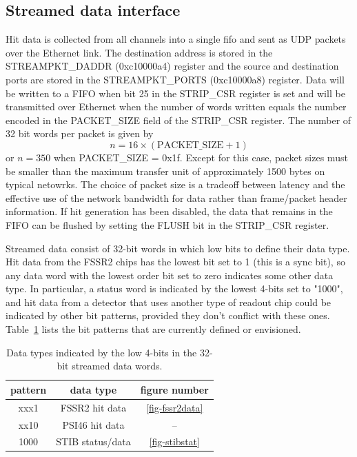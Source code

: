 \documentclass[11pt]{article}
\begin{document}
\subsection{Streamed data interface}
Hit data is collected from all channels into a single fifo and sent
as UDP packets over the Ethernet link.  The destination address is
stored in the STREAMPKT\_DADDR (0xc10000a4) register and the source
and destination ports are stored in the STREAMPKT\_PORTS (0xc10000a8)
register.  Data will be written to a FIFO when bit 25 in the STRIP\_CSR
register is set and will be transmitted over Ethernet when the number
of words written equals the number encoded in the PACKET\_SIZE field of
the STRIP\_CSR register.  The number of 32 bit words per packet is
given by
\begin{equation}
  n = 16 \times (\mbox{PACKET\_SIZE} + 1)
\end{equation}
or $n=350$ when PACKET\_SIZE = 0x1f.  Except for this case, packet
sizes must be smaller than the maximum transfer unit of approximately
1500 bytes on typical netowrks.  The choice of packet size is a tradeoff
between latency and the effective use of the network bandwidth for data
rather than frame/packet header information.
If hit generation has been disabled, the data that remains in the FIFO can
be flushed by setting the FLUSH bit in the STRIP\_CSR register.

Streamed data consist of 32-bit words in which low bits to define
their data type.  Hit data from the FSSR2 chips has the lowest bit
set to 1 (this is a sync bit), so any data word with the lowest order bit
set to zero indicates some other data type.  In particular, a status word
is indicated by the lowest 4-bits set to "1000", and hit data from a
detector that uses another type of readout chip could be indicated by other
bit patterns, provided they don't conflict with these ones.
Table~\ref{tab-datatype} lists the bit patterns that are currently defined
or envisioned.
\begin{table}
\begin{center}
\begin{tabular}{|c|c|c|}\hline
pattern & data type & figure number \\ \hline\hline
xxx1 & FSSR2 hit data & \ref{fig-fssr2data} \\
xx10 & PSI46 hit data &  -- \\
1000 & STIB status/data & \ref{fig-stibstat} \\ \hline
\end{tabular}
\caption{\label{tab-datatype}Data types indicated by the low 4-bits in the
32-bit streamed data words.}
\end{center}
\end{table}
\end{document}
